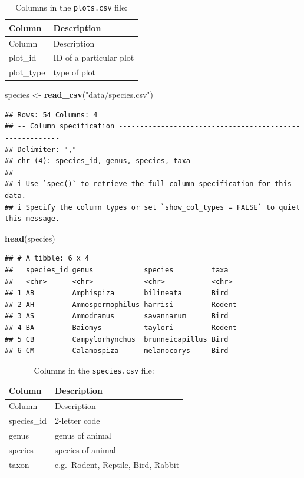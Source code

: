 \documentclass[
  10pt,
  letterpaper,
  twoside,
  openright]{book}
\newenvironment{Shaded}{\begin{snugshade}}{\end{snugshade}}
\newcommand{\FunctionTok}[1]{\textcolor[rgb]{0.13,0.29,0.53}{\textbf{#1}}}
\newcommand{\NormalTok}[1]{#1}
\newcommand{\OtherTok}[1]{\textcolor[rgb]{0.56,0.35,0.01}{#1}}
\newcommand{\StringTok}[1]{\textcolor[rgb]{0.31,0.60,0.02}{#1}}
\begin{document}
\begin{longtable}[]{@{}ll@{}}
\caption{Columns in the \texttt{plots.csv} file:}\tabularnewline
\toprule\noalign{}
Column & Description \\
\midrule\noalign{}
\endfirsthead
\toprule\noalign{}
Column & Description \\
\midrule\noalign{}
\endhead
\bottomrule\noalign{}
\endlastfoot
plot\_id & ID of a particular plot \\
plot\_type & type of plot \\
\end{longtable}

\begin{Shaded}
\begin{Highlighting}[]
\NormalTok{species }\OtherTok{\textless{}{-}} \FunctionTok{read\_csv}\NormalTok{(}\StringTok{"data/species.csv"}\NormalTok{)}
\end{Highlighting}
\end{Shaded}

\begin{verbatim}
## Rows: 54 Columns: 4
## -- Column specification --------------------------------------------------------
## Delimiter: ","
## chr (4): species_id, genus, species, taxa
## 
## i Use `spec()` to retrieve the full column specification for this data.
## i Specify the column types or set `show_col_types = FALSE` to quiet this message.
\end{verbatim}

\begin{Shaded}
\begin{Highlighting}[]
\FunctionTok{head}\NormalTok{(species)}
\end{Highlighting}
\end{Shaded}

\begin{verbatim}
## # A tibble: 6 x 4
##   species_id genus            species         taxa  
##   <chr>      <chr>            <chr>           <chr> 
## 1 AB         Amphispiza       bilineata       Bird  
## 2 AH         Ammospermophilus harrisi         Rodent
## 3 AS         Ammodramus       savannarum      Bird  
## 4 BA         Baiomys          taylori         Rodent
## 5 CB         Campylorhynchus  brunneicapillus Bird  
## 6 CM         Calamospiza      melanocorys     Bird
\end{verbatim}

\begin{longtable}[]{@{}ll@{}}
\caption{Columns in the \texttt{species.csv} file:}\tabularnewline
\toprule\noalign{}
Column & Description \\
\midrule\noalign{}
\endfirsthead
\toprule\noalign{}
Column & Description \\
\midrule\noalign{}
\endhead
\bottomrule\noalign{}
\endlastfoot
species\_id & 2-letter code \\
genus & genus of animal \\
species & species of animal \\
taxon & e.g.~Rodent, Reptile, Bird, Rabbit \\
\end{longtable}
\end{document}
